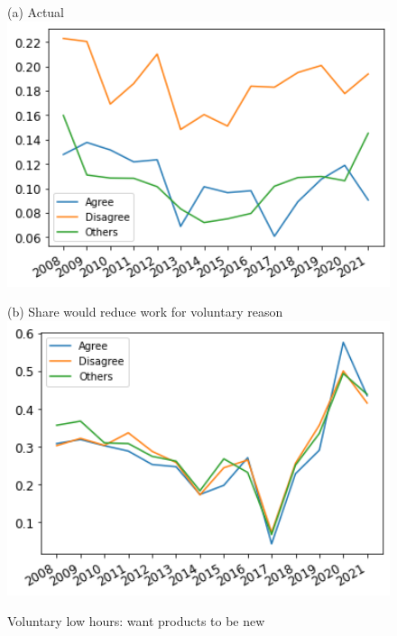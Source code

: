 \documentclass[12pt]{article}
\begin{document}
\begin{figure}[h!!]
	\centering	
	\caption{Voluntary low hours: want products to be new }\label{fig:evolution_wtr_newThings}	
	\begin{minipage}[h!!]{0.32\textwidth}  
		\centering\footnotesize{(a) Actual}
		\includegraphics[width=1\textwidth]{../codding_data/results/liss/broad_groups_work_redcuctionqk20a148_actual.png}
	\end{minipage}
	\begin{minipage}[h!!]{0.32\textwidth}
		\centering\footnotesize{(b) Share would reduce work for voluntary reason}
		\includegraphics[width=1\textwidth]{../codding_data/results/liss/broad_groups_work_redcuctionqk20a148_willing.png}
	\end{minipage}
\end{figure}
\end{document}
